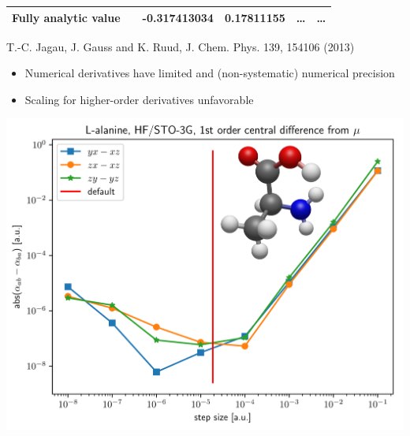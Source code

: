 \documentclass[xcolor=usenames,dvipsnames,svgnames]{beamer}
\begin{document}
\begin{frame}
\begin{table}
\begin{tabular}{llllll}
      Fully analytic value & & -0.317413034 & 0.17811155 & \dots & \dots \\
      \bottomrule
    \end{tabular}
    T.-C. Jagau, J. Gauss and K. Ruud, J. Chem. Phys. 139, 154106 (2013)
  \end{table}
  \begin{itemize}
  \item Numerical derivatives have limited and (non-systematic) numerical precision
  \item Scaling for higher-order derivatives unfavorable
  \end{itemize}
\end{frame}

\begin{frame}
  \centering
  \includegraphics[width=\linewidth,keepaspectratio]{../diff_overlay2.pdf}
\end{frame}
\end{document}

